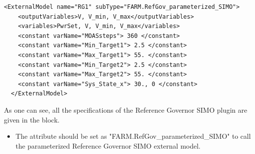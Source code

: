 \begin{lstlisting}[style=XML,morekeywords={anAttribute},
caption=Reference Governor SIMO ExternalModel Example., label=lst:Para_RGSIMOExample]
  <ExternalModel name="RG1" subType="FARM.RefGov_parameterized_SIMO">
    <outputVariables>V, V_min, V_max</outputVariables>
    <variables>PwrSet, V, V_min, V_max</variables>
    <constant varName="MOASsteps"> 360 </constant>
    <constant varName="Min_Target1"> 2.5 </constant>
    <constant varName="Max_Target1"> 55. </constant>
    <constant varName="Min_Target2"> 2.5 </constant>
    <constant varName="Max_Target2"> 55. </constant>
    <constant varName="Sys_State_x"> 30., 0 </constant>
  </ExternalModel>
\end{lstlisting}

As one can see, all the specifications of the Reference Governor SIMO plugin are given in the  
block. 
\begin{itemize}
  \item The  attribute should be set as "FARM.RefGov\_parameterized\_SIMO" to call the parameterized 
  Reference Governor SIMO external model.
\end{itemize}

